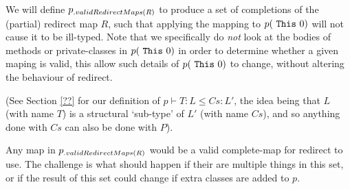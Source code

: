 We will define $p{{}_{.{validRedirectMaps}({R})}}$ to produce a set of completions of the (partial) redirect map $R$, such that applying the mapping to $p( \mbox{ {\texttt{This}} } {0})$ will not cause it to be ill-typed. Note that we specifically do \emph{not} look at the bodies of methods or private-classes in $p( \mbox{ {\texttt{This}} } {0})$ in order to determine whether a given maping is valid, this allow such details of $p( \mbox{ {\texttt{This}} } {0})$ to change, without altering the behaviour of redirect.


\begin{defs}
{}
\end{defs}

(See Section \ref{??} for our definition of $p \vdash T : L \leq Cs : L'$, the idea being that $L$ (with name $T$) is a structural `sub-type' of $L'$ (with name $Cs$), and so anything done with $Cs$ can also be done with $P$).

Any map in $p{{}_{.{validRedirectMaps}({R})}}$ would be a valid complete-map for redirect to use. The challenge is what should happen if their are multiple things in this set, or if the result of this set could change if extra classes are added to $p$.